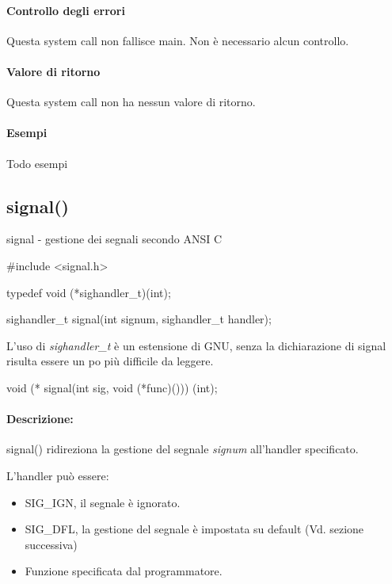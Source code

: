 \documentclass
[10pt,        %
 a4paper,     %
 onecolumn,   %
 fleqn,       %
 oneside,     %
 notitlepage, %
]{article}    %
\begin{document}
\paragraph{Controllo degli errori}
Questa system call non fallisce main. Non è necessario alcun controllo.

\paragraph{Valore di ritorno}
Questa system call non ha nessun valore di ritorno.

\paragraph{Esempi}
Todo esempi



\subsection{signal()}
signal - gestione dei segnali secondo ANSI C
\begin{C}
#include <signal.h>

typedef void (*sighandler_t)(int);

sighandler_t signal(int signum, sighandler_t handler);
\end{C}

L'uso di \textit{sighandler\_t} è un estensione di GNU, senza la dichiarazione di signal risulta essere un po più difficile da leggere.

\begin{C}
void (* signal(int sig, void (*func)())) (int);
\end{C}

\paragraph{Descrizione:}
signal() ridireziona la gestione del segnale \textit{signum} all'handler specificato.

L'handler può essere:
\begin{itemize}
   \item SIG\_IGN, il segnale è ignorato.
   \item SIG\_DFL, la gestione del segnale è impostata su default (Vd. sezione successiva)
   \item Funzione specificata dal programmatore.
\end{itemize}
\end{document}
